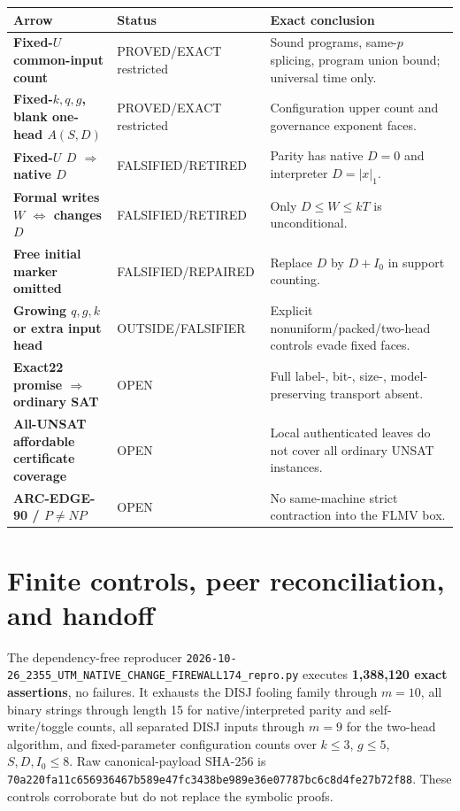 \documentclass[11pt]{article}
\begin{document}
\begin{center}\small
\begin{tabularx}{.98\linewidth}{>{\bfseries}p{.25\linewidth}p{.18\linewidth}X}
\toprule
Arrow & Status & Exact conclusion\\\midrule
Fixed-$U$ common-input count & PROVED/EXACT restricted & Sound programs, same-$p$ splicing, program union bound; universal time only.\\
Fixed-$k,q,g$, blank one-head $A(S,D)$ & PROVED/EXACT restricted & Configuration upper count and governance exponent faces.\\
Fixed-$U$ $D$ $\Rightarrow$ native $D$ & FALSIFIED/RETIRED & Parity has native $D=0$ and interpreter $D=|x|_1$.\\
Formal writes $W$ $\Leftrightarrow$ changes $D$ & FALSIFIED/RETIRED & Only $D\le W\le kT$ is unconditional.\\
Free initial marker omitted & FALSIFIED/REPAIRED & Replace $D$ by $D+I_0$ in support counting.\\
Growing $q,g,k$ or extra input head & OUTSIDE/FALSIFIER & Explicit nonuniform/packed/two-head controls evade fixed faces.\\
Exact22 promise $\Rightarrow$ ordinary SAT & OPEN & Full label-, bit-, size-, model-preserving transport absent.\\
All-UNSAT affordable certificate coverage & OPEN & Local authenticated leaves do not cover all ordinary UNSAT instances.\\
ARC-EDGE-90 / $P\ne NP$ & OPEN & No same-machine strict contraction into the FLMV box.\\\bottomrule
\end{tabularx}
\end{center}

\section{Finite controls, peer reconciliation, and handoff}
The dependency-free reproducer \texttt{2026-10-26\_2355\_UTM\_NATIVE\_CHANGE\_FIREWALL174\_repro.py} executes \textbf{1,388,120 exact assertions}, no failures.  It exhausts the DISJ fooling family through $m=10$, all binary strings through length 15 for native/interpreted parity and self-write/toggle counts, all separated DISJ inputs through $m=9$ for the two-head algorithm, and fixed-parameter configuration counts over $k\le3$, $g\le5$, $S,D,I_0\le8$.  Raw canonical-payload SHA-256 is \texttt{70a220fa11c656936467b589e47fc3438be989e36e07787bc6c8d4fe27b72f88}.  These controls corroborate but do not replace the symbolic proofs.
\end{document}
